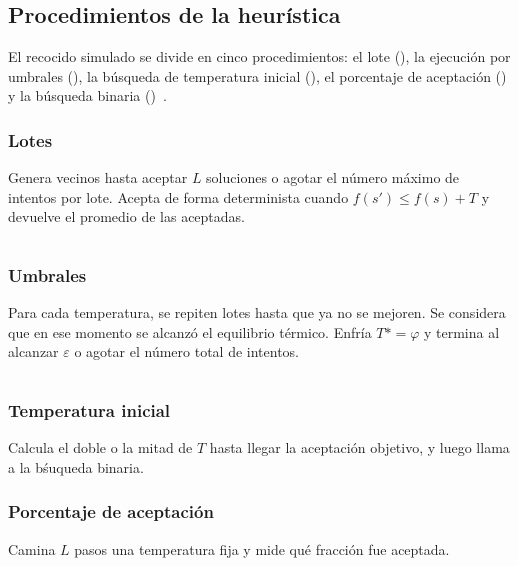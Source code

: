 \documentclass[9pt,a4paper,twocolumn,twoside]{tau-class/tau}
\begin{document}
    \subsection{Procedimientos de la heur\'istica}
    El recocido simulado se divide en cinco procedimientos: el lote (), la ejecuci\'on por umbrales (), la búsqueda de temperatura inicial (), el porcentaje de aceptación () y la búsqueda binaria ()~\cite{pelaez-notas}.

    \subsubsection{Lotes}

    Genera vecinos hasta aceptar $L$ soluciones o agotar el n\'umero m\'aximo de intentos por lote. Acepta de forma determinista cuando $f(s') \leq f(s) + T$ y devuelve el promedio de las aceptadas.
    
		\begin{code}
			\inputminted{java}{Lotes.java}
            \caption{M\'etodo  para calcular lotes.}
			\label{lst:batch}
		\end{code}

        \subsubsection{Umbrales}
    
        Para cada temperatura, se repiten lotes hasta que ya no se mejoren. Se considera que en ese momento se alcanz\'o el equilibrio t\'ermico. Enfr\'ia $T *=\varphi$ y termina al alcanzar $\varepsilon$ o agotar el n\'umero total de intentos.
        
    		\begin{code}
    			\inputminted{java}{Lotes.java}
                \caption{Ciclo de .}
    			\label{lst:batch}
    		\end{code}
    
        \subsubsection{Temperatura inicial}
        Calcula el doble o la mitad de $T$ hasta llegar la aceptaci\'on objetivo, y luego llama a la b\'suqueda binaria.
        
        \subsubsection{Porcentaje de aceptaci\'on}
        Camina $L$ pasos una temperatura fija y mide qu\'e fracci\'on fue aceptada.
    
\end{document}
